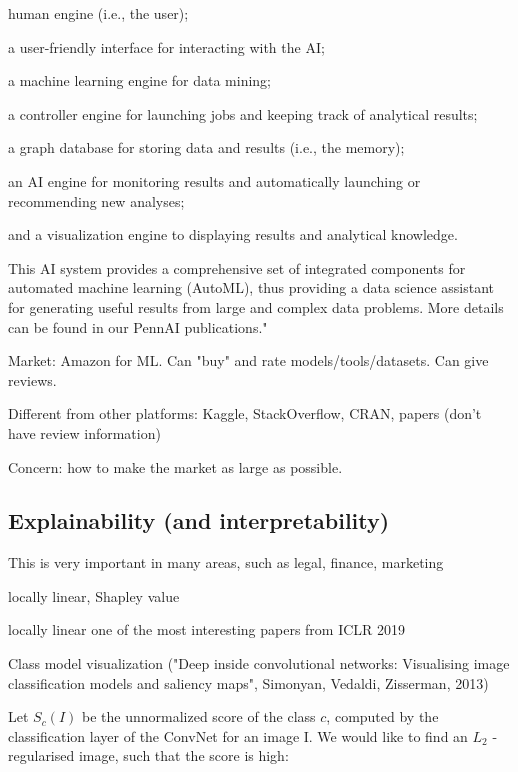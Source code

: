 \documentclass[english]{article}
\begin{document}
human engine (i.e., the user); 

a user-friendly interface for interacting with the AI; 

a machine learning engine for data mining; 

a controller engine for launching jobs and keeping track of analytical results; 

a graph database for storing data and results (i.e., the memory); 

an AI engine for monitoring results and automatically launching or recommending new analyses; 

and a visualization engine to displaying results and analytical knowledge. 

This AI system provides a comprehensive set of integrated components for automated machine learning (AutoML), thus providing a data science assistant for generating useful results from large and complex data problems. More details can be found in our PennAI publications."

\item Market: Amazon for ML. Can "buy" and rate models/tools/datasets. Can give reviews. 

Different from other platforms: Kaggle, StackOverflow, CRAN, papers (don't have review information)

Concern: how to make the market as large as possible.  

\eenum 


\subsection{Explainability (and interpretability)}


\benum 
\item This is very important in many areas, such as legal, finance, marketing

locally linear, Shapley value

    locally linear one of the most interesting papers from ICLR 2019

\item Class model visualization ("Deep inside convolutional networks: Visualising image classification models and saliency maps", Simonyan, Vedaldi, Zisserman, 2013)

Let $S_c(I)$ be the unnormalized score of the class $c$, computed by the classification layer of the ConvNet for an image I. We would like to find an $L_2$  - regularised image, such that the score is
high:
\end{document}
